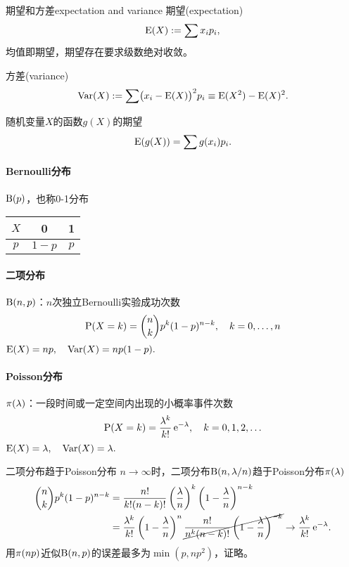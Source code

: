 \begin{definition}{期望和方差}{expectation and variance}
	期望(expectation)
	\begin{align}
		\E(X):=\sum x_ip_i,
	\end{align}
	均值即期望，期望存在要求级数绝对收敛。

	方差(variance)
	\begin{align}
		\Var(X):=\sum\bigkh{x_i-\E(X)}^2p_i\equiv\E(X^2)-\E(X)^2.
	\end{align}
\end{definition}
随机变量$X$的函数$g(X)$的期望
\[
	\E(g(X))=\sum g(x_i)p_i.
\]
\paragraph{Bernoulli分布}$\Bern(p)$，也称0-1分布
\begin{center}
	\begin{tabular}{ccc}
		\toprule
		$X$&0&1\\
		\midrule
		$p$&$1-p$&$p$\\
		\bottomrule
	\end{tabular}
\end{center}
\paragraph{二项分布}$\Bern(n,p)$：$n$次独立Bernoulli实验成功次数
\[
	\P(X=k)={n\choose k}p^k(1-p)^{n-k},\quad k=0,\ldots,n
\]
$\E(X)=np,\quad\Var(X)=np(1-p).$
\paragraph{Poisson分布}$\Pois(\lambda)$：一段时间或一定空间内出现的小概率事件次数%
\[
	\P(X=k)=\frac{\lambda^k}{k!}\e{-\lambda},\quad k=0,1,2,\ldots
\]
$\E(X)=\lambda,\quad\Var(X)=\lambda.$
\begin{theorem}{二项分布趋于Poisson分布}{}
	$n\to\infty$时，二项分布$\Bern(n,\lambda/n)$趋于Poisson分布$\Pois(\lambda)$
	\begin{align*}
		{n\choose k}p^k(1-p)^{n-k}&=\frac{n!}{k!(n-k)!}\kh{\frac\lambda{n}}^k\kh{1-\frac\lambda{n}}^{n-k}\\
		&=\frac{\lambda^k}{k!}\kh{1-\frac\lambda{n}}^n\cancel{\frac{n!}{n^k(n-k)!}\kh{1-\frac\lambda{n}}^{-k}}\to\frac{\lambda^k}{k!}\e{-\lambda}.
	\end{align*}
	用$\Pois(np)$近似$\Bern(n,p)$的误差最多为$\min(p,np^2)$，证略。
\end{theorem}

